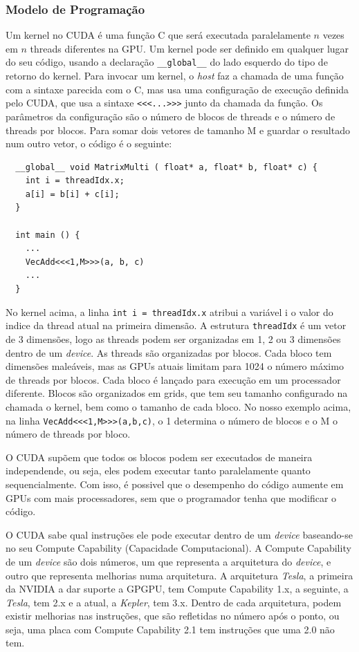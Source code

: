 \subsubsection{Modelo de Programação}
Um kernel no CUDA é uma função C que será executada paralelamente $n$ vezes em $n$ threads diferentes na GPU. Um kernel pode ser
definido em qualquer lugar do seu código, usando a declaração \verb#__global__# do lado esquerdo do tipo de retorno do kernel.
Para invocar um kernel, o \textit{host} faz a chamada de uma função com a sintaxe parecida com o C, mas usa uma configuração de
execução definida pelo CUDA, que usa a sintaxe \verb#<<<...>>># junto da chamada da função. Os parâmetros da configuração são
o número de blocos de threads e o número de threads por blocos. Para somar dois vetores de tamanho M e guardar o resultado num
outro vetor, o código é o seguinte:

\begin{lstlisting}
  __global__ void MatrixMulti ( float* a, float* b, float* c) { 
    int i = threadIdx.x;
    a[i] = b[i] + c[i];        
  }
                            
  int main () {               
    ...                       
    VecAdd<<<1,M>>>(a, b, c)  
    ...                       
  }                                 
\end{lstlisting}

No kernel acima, a linha \verb#int i = threadIdx.x# atribui a variável i o valor do indice da thread atual na primeira dimensão. 
A estrutura \verb#threadIdx# é um vetor de 3 dimensões, logo as threads podem ser organizadas em 1, 2 ou 3 dimensões dentro de um
\textit{device}. As threads são organizadas por blocos. Cada bloco tem dimensões maleáveis, mas as GPUs atuais limitam para 1024 o 
número máximo de threads por blocos. Cada bloco é lançado para execução em um processador diferente. Blocos são organizados em 
grids, que tem seu tamanho configurado na chamada o kernel, bem como o tamanho de cada bloco. No nosso exemplo acima, na linha
\verb#VecAdd<<<1,M>>>(a,b,c)#, o 1 determina o número de blocos e o M o número de threads por bloco.

O CUDA supõem que todos os blocos podem ser executados de maneira independende, ou seja, eles podem executar tanto paralelamente
quanto sequencialmente. Com isso, é possivel que o desempenho do código aumente em GPUs com mais processadores, sem que o programador
tenha que modificar o código.

O CUDA sabe qual instruções ele pode executar dentro de um \textit{device} baseando-se no seu Compute Capability 
(Capacidade Computacional). A Compute Capability de um \textit{device} são dois números, um que representa a arquitetura do 
\textit{device}, e outro que representa melhorias numa arquitetura.
A arquitetura \textit{Tesla}, a primeira da NVIDIA a dar suporte a GPGPU, tem Compute Capability 1.x, a seguinte, a \textit{Tesla},
tem 2.x e a atual, a \textit{Kepler}, tem 3.x. Dentro de cada arquitetura, podem existir melhorias nas instruções, que são
refletidas no número após o ponto, ou seja, uma placa com Compute Capability 2.1 tem instruções que uma 2.0 não tem.

